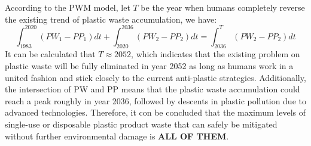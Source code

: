 \documentclass[12pt]{article}
\begin{document}
According to the PWM model, let $T$ be the year when humans completely reverse the existing trend of plastic waste accumulation, we have:
$$\int_{1983}^{2020}(PW_1-PP_1)dt + \int_{2020}^{2036}(PW_2-PP_2)dt = \int_{2036}^{T}(PW_2-PP_2)dt$$
It can be calculated that $T\approx2052$, which indicates that the existing problem on plastic waste will be fully eliminated in year 2052 as long as humans work in a united fashion and stick closely to the current anti-plastic strategies. Additionally, the intersection of PW and PP means that the plastic waste accumulation could reach a peak  roughly in year 2036, followed by descents in plastic pollution due to advanced technologies. Therefore, it con be concluded that the maximum levels of single-use or disposable plastic product waste that can safely be mitigated without further environmental damage is \textbf{ALL OF THEM}.




\end{document}
